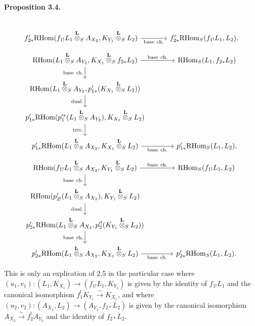 \documentclass[11pt]{article}
\newenvironment{statement}[1]{\par\medskip\noindent\textbf{#1.}\ }{\par\medskip}
\providecommand{\RHom}{\mathrm{RHom}}
\providecommand{\RHom}{\mathrm{RHom}}
\providecommand{\RHom}{\mathrm R\mathcal{H}om}
\providecommand{\RHom}{\mathrm{RHom}}
\begin{document}
\begin{statement}{Proposition 3.4}
\[\begin{tikzcd}[column sep=3.7em,row sep=1.7em]
& \\
f'_{2*}\RHom(f_{1!}L_1\overset{\mathbf L}{\otimes}_S A_{X_2},K_{Y_1}\overset{\mathbf L}{\otimes}_S L_2) \arrow[r,"\mathrm{base\ ch.}"']
& f'_{2*}\RHom_S(f_{1!}L_1,L_2),
\end{tikzcd}
\]
\[
\begin{tikzcd}[column sep=3.7em,row sep=1.7em]
\RHom(L_1\overset{\mathbf L}{\otimes}_S A_{Y_2},K_{X_1}\overset{\mathbf L}{\otimes}_S f_{2*}L_2)
  \arrow[r,"\mathrm{base\ ch.}"] \arrow[d,"\mathrm{base\ ch.}"']
& \RHom_S(L_1,f_{2*}L_2)  \\
\RHom(L_1\overset{\mathbf L}{\otimes}_S A_{Y_2},p'_{1*}(K_{X_1}\overset{\mathbf L}{\otimes}_S L_2)) \arrow[d,"\mathrm{dual.}"']
& \\
p'_{1*}\RHom(p_1'^*(L_1\overset{\mathbf L}{\otimes}_S A_{Y_2}),K_{X_1}\overset{\mathbf L}{\otimes}_S L_2) \arrow[d,"\mathrm{triv.}"']
& \\
p'_{1*}\RHom(L_1\overset{\mathbf L}{\otimes}_S A_{X_2},K_{X_1}\overset{\mathbf L}{\otimes}_S L_2) \arrow[r,"\mathrm{base\ ch.}"']
& p'_{1*}\RHom_S(L_1,L_2),
\end{tikzcd}
\]
\[
\begin{tikzcd}[column sep=3.7em,row sep=1.7em]
\RHom(f_{1!}L_1\overset{\mathbf L}{\otimes}_S A_{X_2},K_{Y_1}\overset{\mathbf L}{\otimes}_S L_2)
  \arrow[r,"\mathrm{base\ ch.}"] \arrow[d,"\mathrm{base\ ch.}"']
& \RHom_S(f_{1!}L_1,L_2)  \\
\RHom(p'_{2!}(L_1\overset{\mathbf L}{\otimes}_S A_{X_2}),K_{Y_1}\overset{\mathbf L}{\otimes}_S L_2) \arrow[d,"\mathrm{dual.}"']
& \\
p'_{2*}\RHom(L_1\overset{\mathbf L}{\otimes}_S A_{X_2},p_2'^!(K_{Y_1}\overset{\mathbf L}{\otimes}_S L_2)) \arrow[d,"\mathrm{base\ ch.}"']
& \\
p'_{2*}\RHom(L_1\overset{\mathbf L}{\otimes}_S A_{X_2},K_{X_1}\overset{\mathbf L}{\otimes}_S L_2) \arrow[r,"\mathrm{base\ ch.}"']
& p'_{2*}\RHom_S(L_1,L_2).
\end{tikzcd}
\]
\end{statement}
This is only an explication of 2.5 in the particular case where $(u_1,v_1):(L_1,K_{X_1})\to(f_{1!}L_1,K_{Y_1})$ is given by the identity of $f_{1!}L_1$ and the canonical isomorphism $f_1^!K_{Y_1}\xrightarrow{\sim}K_{X_1}$, and where $(u_2,v_2):(A_{X_2},L_2)\to(A_{Y_2},f_{2*}L_2)$ is given by the canonical isomorphism $A_{X_2}\xrightarrow{\sim}f_2^!A_{Y_2}$ and the identity of $f_{2*}L_2$.
\end{document}
